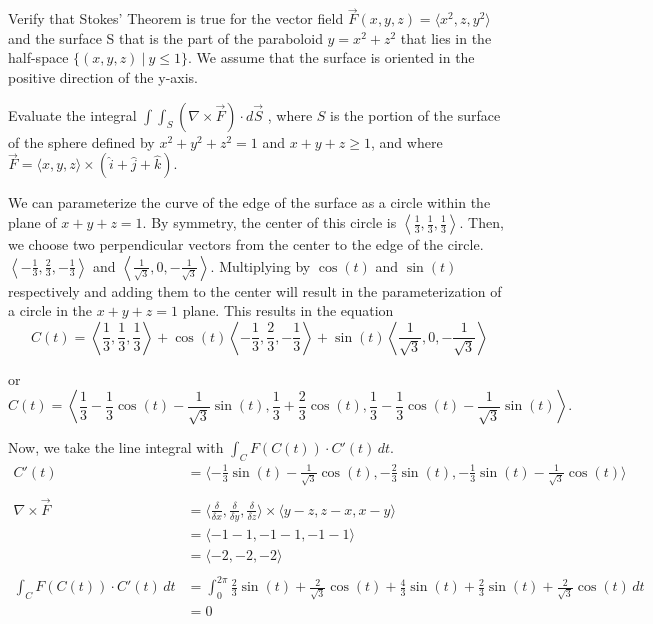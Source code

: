 \documentclass[12pt]{exam}
\begin{document}
\begin{questions}
\question Verify that Stokes' Theorem is true for the vector field $\overrightarrow{F}(x, y, z) = \langle x^2, z, y^2 \rangle$ and the surface S that is the part of the paraboloid $y = x^2 + z^2$ that lies in the half-space $\{(x, y, z)\ |\ y \leq 1\}$. We assume that the surface is oriented in the positive direction of the y-axis.

\question Evaluate the integral $\int \int_S (\nabla \times \overrightarrow{F}) \cdot d\overrightarrow{S}$ , where $S$ is the portion of the surface of the sphere defined by
$x^2 + y^2 + z^2 = 1$ and $x + y + z \geq 1$, and where $\overrightarrow{F} = \langle x, y, z \rangle \times \left(\hat{i} + \hat{j} + \hat{k}\right)$.
    \begin{solution}
        We can parameterize the curve of the edge of the surface as a circle within the plane of $x + y + z = 1$. By symmetry, the center of this circle is $\left\langle\frac{1}{3}, \frac{1}{3}, \frac{1}{3}\right\rangle$. Then, we choose two perpendicular vectors from the center to the edge of the circle. $\left\langle -\frac{1}{3}, \frac{2}{3}, -\frac{1}{3} \right\rangle$ and $\left\langle \frac{1}{\sqrt{3}}, 0, -\frac{1}{\sqrt{3}} \right\rangle$. Multiplying by $\cos(t)$ and $\sin(t)$ respectively and adding them to the center will result in the parameterization of a circle in the $x + y + z = 1$ plane. This results in the equation
        \[ C(t) = \left\langle\frac{1}{3}, \frac{1}{3}, \frac{1}{3}\right\rangle + \cos(t)\left\langle -\frac{1}{3}, \frac{2}{3}, -\frac{1}{3} \right\rangle + \sin(t)\left\langle \frac{1}{\sqrt{3}}, 0, -\frac{1}{\sqrt{3}} \right\rangle \]
        \begin{center}
        or 
        \[ C(t) = \left\langle \frac{1}{3} - \frac{1}{3}\cos(t) - \frac{1}{\sqrt{3}}\sin(t), \frac{1}{3} + \frac{2}{3}\cos(t), \frac{1}{3} - \frac{1}{3} \cos(t) - \frac{1}{\sqrt{3}}\sin(t) \right\rangle.\]
        \end{center}
        Now, we take the line integral with $\int_C F(C(t))\cdot C'(t)\,dt$. 
        \begin{align*}
            C'(t) &= \langle -\frac{1}{3}\sin(t) - \frac{1}{\sqrt{3}}\cos(t), -\frac{2}{3}\sin(t), -\frac{1}{3}\sin(t) - \frac{1}{\sqrt{3}}\cos(t) \rangle \\\\
            \nabla \times \overrightarrow{F} &= \langle \frac{\delta}{\delta x}, \frac{\delta}{\delta y}, \frac{\delta}{\delta z}\rangle \times \langle y-z, z-x, x-y\rangle \\
            &= \langle -1 - 1, -1 - 1, -1 - 1 \rangle \\
            &= \langle -2, -2, -2 \rangle \\\\
            \int_C F(C(t))\cdot C'(t)\,dt &= \int_{0}^{2\pi} \frac{2}{3}\sin(t)+\frac{2}{\sqrt{3}}\cos(t)+\frac{4}{3}\sin(t)+\frac{2}{3}\sin(t)+\frac{2}{\sqrt{3}}\cos(t)\,dt\\
            &= \boxed{0}
        \end{align*}
    \end{solution}


\end{questions}
\end{document}

